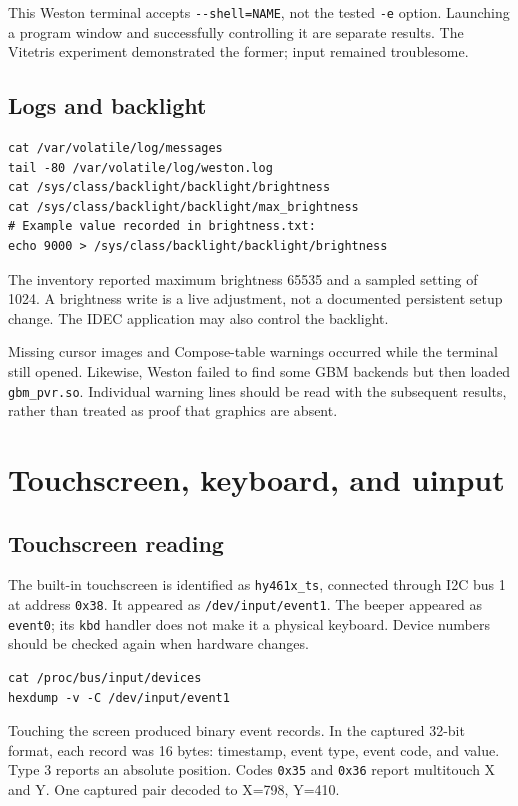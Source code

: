 \documentclass[10pt,letterpaper]{article}
\newcommand{\file}[1]{\nolinkurl{#1}}
\begin{document}
This Weston terminal accepts \file{--shell=NAME}, not the tested \file{-e} option.
Launching a program window and successfully controlling it are separate results.
The Vitetris experiment demonstrated the former; input remained troublesome.

\subsection{Logs and backlight}
\begin{lstlisting}
cat /var/volatile/log/messages
tail -80 /var/volatile/log/weston.log
cat /sys/class/backlight/backlight/brightness
cat /sys/class/backlight/backlight/max_brightness
# Example value recorded in brightness.txt:
echo 9000 > /sys/class/backlight/backlight/brightness
\end{lstlisting}
The inventory reported maximum brightness 65535 and a sampled setting of 1024.
A brightness write is a live adjustment, not a documented persistent setup
change. The IDEC application may also control the backlight.

Missing cursor images and Compose-table warnings occurred while the terminal
still opened. Likewise, Weston failed to find some GBM backends but then loaded
\file{gbm_pvr.so}. Individual warning lines should be read with the subsequent
results, rather than treated as proof that graphics are absent.

\newpage
\section{Touchscreen, keyboard, and uinput}\label{input}
\subsection{Touchscreen reading}
The built-in touchscreen is identified as \file{hy461x_ts}, connected through
I2C bus 1 at address \file{0x38}. It appeared as \file{/dev/input/event1}.
The beeper appeared as \file{event0}; its \file{kbd} handler does not make it a
physical keyboard. Device numbers should be checked again when hardware changes.
\begin{lstlisting}
cat /proc/bus/input/devices
hexdump -v -C /dev/input/event1
\end{lstlisting}
Touching the screen produced binary event records. In the captured 32-bit
format, each record was 16 bytes: timestamp, event type, event code, and value.
Type 3 reports an absolute position. Codes \file{0x35} and \file{0x36} report
multitouch X and Y. One captured pair decoded to X=798, Y=410.
\end{document}
